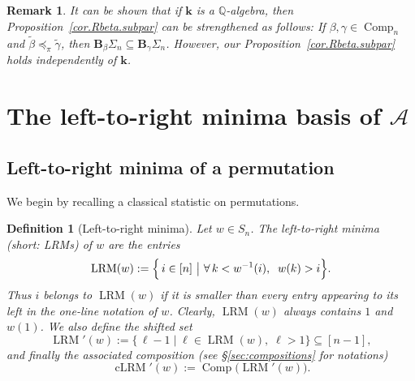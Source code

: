 \documentclass[submission]{FPSAC2026}
\newtheorem{defn}{Definition}
\newtheorem{remark}{Remark}
\newcommand{\QQ}{\mathbb{Q}} %
\newcommand{\kk}{\mathbf{k}} %
\newcommand{\BB}{\mathbf{B}} %
\newcommand{\Comp}{\operatorname{Comp}}
\begin{document}
\begin{remark}
It can be shown that if $\kk$ is a $\QQ$-algebra, then
Proposition~\ref{cor.Rbeta.subpar} can be strengthened
as follows:
If \(\beta,\gamma\in\Comp_n\) and \(\widetilde{\beta}\preceq_\pi\widetilde{\gamma}\), then
\(\BB_\beta \Sigma_n \subseteq \BB_\gamma \Sigma_n \).
However, our Proposition~\ref{cor.Rbeta.subpar} holds
independently of $\kk$.
\end{remark}


\section{The left-to-right minima basis of $\mathcal{A}$}
\label{sec.lrm-basis}
\subsection{Left-to-right minima of a permutation}

We begin by recalling a classical statistic on permutations.

\begin{defn}[Left-to-right minima]
Let $w\in S_n$.  
The \emph{left-to-right minima} (short: \emph{LRMs})
of $w$ are the entries 
\[
\operatorname{LRM}(w)
 := \Bigl\{\, i\in[n]\ \big|\ \forall\, k<w^{-1}(i),\;\; w(k)>i \Bigr\}.
\]
Thus $i$ belongs to $\operatorname{LRM}(w)$ if it is smaller than every entry appearing to its left in the one-line notation of $w$.
Clearly, $\operatorname{LRM}(w)$ always contains $1$ and $w(1)$.
We also define the shifted set
\[
\operatorname{LRM}'(w)
 := \{\, \ell-1\mid \ell\in\operatorname{LRM}(w),\;\ell>1\}
 \subseteq [n-1],
\]
and finally the associated composition
(see \S\ref{sec:compositions} for notations)
\[
\operatorname{cLRM}'(w)
 := \Comp\bigl(\operatorname{LRM}'(w)\bigr).
\]
\end{defn}
\end{document}
